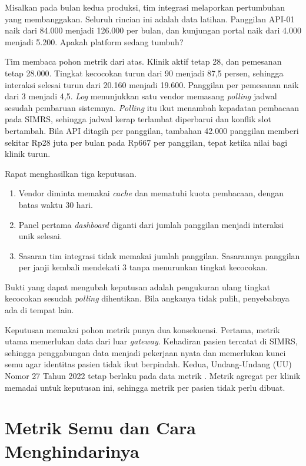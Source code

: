 \begin{kasus}[title={Kasus Medikara Health: Panggilan Naik 50 Persen, Janji Selesai Turun}]
Misalkan pada bulan kedua produksi, tim integrasi melaporkan pertumbuhan yang membanggakan. Seluruh rincian ini adalah data latihan. Panggilan API-01 naik dari 84.000
menjadi 126.000 per bulan, dan kunjungan portal naik dari 4.000 menjadi 5.200. Apakah platform sedang tumbuh?

Tim membaca pohon metrik dari atas. Klinik aktif tetap 28, dan pemesanan tetap 28.000. Tingkat kecocokan turun dari 90 menjadi 87,5 persen, sehingga interaksi selesai turun
dari 20.160 menjadi 19.600. Panggilan per pemesanan naik dari 3 menjadi 4,5. \textit{Log} menunjukkan satu vendor memasang \textit{polling} jadwal sesudah pembaruan sistemnya.
\textit{Polling} itu ikut menambah kepadatan pembacaan pada SIMRS, sehingga jadwal kerap terlambat diperbarui dan konflik slot bertambah. Bila API ditagih per panggilan,
tambahan 42.000 panggilan memberi sekitar Rp28 juta per bulan pada Rp667 per panggilan, tepat ketika nilai bagi klinik turun.

Rapat menghasilkan tiga keputusan.
\begin{enumerate}
  \item Vendor diminta memakai \textit{cache} dan mematuhi kuota pembacaan, dengan batas waktu 30 hari.
  \item Panel pertama \textit{dashboard} diganti dari jumlah panggilan menjadi interaksi unik selesai.
  \item Sasaran tim integrasi tidak memakai jumlah panggilan. Sasarannya panggilan per janji kembali mendekati 3 tanpa menurunkan tingkat kecocokan.
\end{enumerate}

Bukti yang dapat mengubah keputusan adalah pengukuran ulang tingkat kecocokan sesudah \textit{polling} dihentikan. Bila angkanya tidak pulih, penyebabnya ada di tempat lain.
\end{kasus}

Keputusan memakai pohon metrik punya dua konsekuensi. Pertama, metrik utama memerlukan data dari luar \textit{gateway}. Kehadiran pasien tercatat di SIMRS, sehingga penggabungan data menjadi pekerjaan nyata dan memerlukan kunci semu agar identitas pasien tidak ikut berpindah. Kedua, Undang-Undang (UU) Nomor
27 Tahun 2022 tetap berlaku pada data metrik \cite{uu27-2022-pdp}. Metrik agregat per klinik memadai untuk keputusan ini, sehingga metrik per pasien tidak perlu dibuat.

\section{Metrik Semu dan Cara Menghindarinya}

